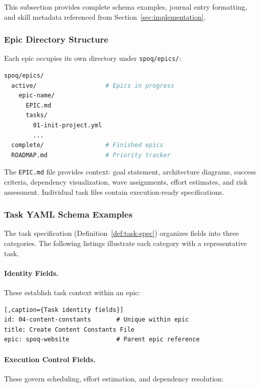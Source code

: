 This subsection provides complete schema examples, journal entry formatting, and
skill metadata referenced from Section~\ref{sec:implementation}.

\subsubsection{Epic Directory Structure}

Each epic occupies its own directory under \texttt{spoq/epics/}:

\begin{lstlisting}[language=bash,caption={Epic directory layout}]
spoq/epics/
  active/                   # Epics in progress
    epic-name/
      EPIC.md
      tasks/
        01-init-project.yml
        ...
  complete/                 # Finished epics
  ROADMAP.md                # Priority tracker
\end{lstlisting}

The \texttt{EPIC.md} file provides context: goal statement, architecture diagrams,
success criteria, dependency visualization, wave assignments, effort estimates,
and risk assessment. Individual task files contain execution-ready specifications.

\subsubsection{Task YAML Schema Examples}

The task specification (Definition~\ref{def:task-spec}) organizes fields into
three categories. The following listings illustrate each category with a
representative task.

\paragraph{Identity Fields.}
These establish task context within an epic:

\begin{lstlisting}[,caption={Task identity fields}]
id: 04-content-constants       # Unique within epic
title: Create Content Constants File
epic: spoq-website             # Parent epic reference
\end{lstlisting}

\needspace{10cm}
\paragraph{Execution Control Fields.}
These govern scheduling, effort estimation, and dependency resolution:

